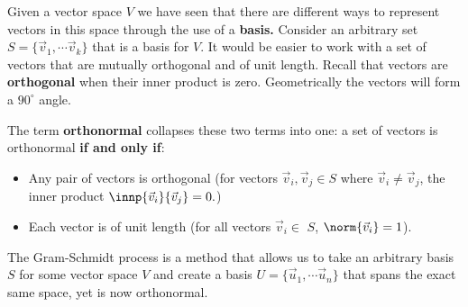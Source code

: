 \pgfplotsset{width=7cm,compat=1.16}


Given a vector space $V$ we have seen that there are different ways to represent vectors in this space through the use of a \textbf{basis.} Consider an arbitrary set $S = \{ \vec{v}_{1}, \cdots \vec{v}_{k} \}$ that is a basis for $V.$ It would be easier to work with a set of vectors that are mutually orthogonal and of unit length. Recall that vectors are \textbf{orthogonal} when their inner product is zero. Geometrically the vectors will form a $90^{\circ}$ angle.

The term \textbf{orthonormal} collapses these two terms into one: a set of vectors is orthonormal \textbf{if and only if}:
  \begin{itemize}
    \item Any pair of vectors is orthogonal (for vectors $\vec{v}_{i}, \vec{v}_{j} \in S$ where $\vec{v}_{i} \neq \vec{v}_{j}$, the inner product $\innp{\vec{v}_{i}}{\vec{v}_{j}} = 0.$)
    \item Each vector is of unit length (for all vectors $\vec{v}_{i} \in $ $S$, $\norm{\vec{v}_{i}} = 1$).
  \end{itemize}

The Gram-Schmidt process is a method that allows us to take an arbitrary basis $S$ for some vector space $V$ and create a basis $U = \{ \vec{u}_{1}, \cdots \vec{u}_{n} \}$ that spans the exact same space, yet is now orthonormal.

